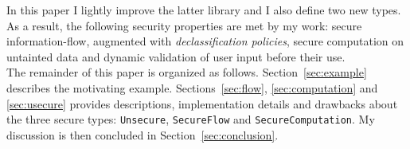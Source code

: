 In this paper I lightly improve the latter library and I also define two new types. As a result, the following security properties are met by my work: secure information-flow, augmented with \textit{declassification policies}, secure computation on untainted data and dynamic validation of user input before their use. \\
The remainder of this paper is organized as follows. Section~\ref{sec:example} describes the motivating example. Sections~\ref{sec:flow}, \ref{sec:computation} and \ref{sec:usecure} provides descriptions, implementation details and drawbacks about the three secure types: \texttt{Unsecure}, \texttt{SecureFlow} and \texttt{SecureComputation}. My discussion is then concluded in Section~\ref{sec:conclusion}.
